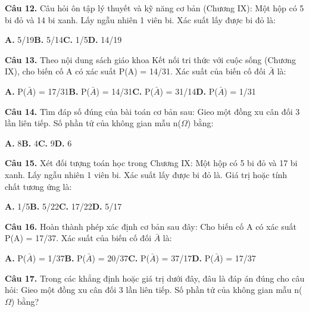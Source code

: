 \documentclass[11pt,a4paper]{article}
\begin{document}
\textbf{\color{primary} Câu 12.} Câu hỏi ôn tập lý thuyết và kỹ năng cơ bản (Chương IX): Một hộp có 5 bi đỏ và 14 bi xanh. Lấy ngẫu nhiên 1 viên bi. Xác suất lấy được bi đỏ là:\par
\hspace*{1.5em}\textbf{A.} 5/19\quad\quad \textbf{B.} 5/14\quad\quad \textbf{C.} 1/5\quad\quad \textbf{D.} 14/19\par\vspace{2pt}
\textbf{\color{primary} Câu 13.} Theo nội dung sách giáo khoa Kết nối tri thức với cuộc sống (Chương IX), cho biến cố A có xác suất P(A) = 14/31. Xác suất của biến cố đối $\bar{A}$ là:\par
\hspace*{1.5em}\textbf{A.} P($\bar{A}$) = 17/31\quad\quad \textbf{B.} P($\bar{A}$) = 14/31\quad\quad \textbf{C.} P($\bar{A}$) = 31/14\quad\quad \textbf{D.} P($\bar{A}$) = 1/31\par\vspace{2pt}
\textbf{\color{primary} Câu 14.} Tìm đáp số đúng của bài toán cơ bản sau: Gieo một đồng xu cân đối 3 lần liên tiếp. Số phần tử của không gian mẫu n($\Omega$) bằng:\par
\hspace*{1.5em}\textbf{A.} 8\quad\quad \textbf{B.} 4\quad\quad \textbf{C.} 9\quad\quad \textbf{D.} 6\par\vspace{2pt}
\textbf{\color{primary} Câu 15.} Xét đối tượng toán học trong Chương IX: Một hộp có 5 bi đỏ và 17 bi xanh. Lấy ngẫu nhiên 1 viên bi. Xác suất lấy được bi đỏ là. Giá trị hoặc tính chất tương ứng là:\par
\hspace*{1.5em}\textbf{A.} 1/5\quad\quad \textbf{B.} 5/22\quad\quad \textbf{C.} 17/22\quad\quad \textbf{D.} 5/17\par\vspace{2pt}
\textbf{\color{primary} Câu 16.} Hoàn thành phép xác định cơ bản sau đây: Cho biến cố A có xác suất P(A) = 17/37. Xác suất của biến cố đối $\bar{A}$ là:\par
\hspace*{1.5em}\textbf{A.} P($\bar{A}$) = 1/37\quad\quad \textbf{B.} P($\bar{A}$) = 20/37\quad\quad \textbf{C.} P($\bar{A}$) = 37/17\quad\quad \textbf{D.} P($\bar{A}$) = 17/37\par\vspace{2pt}
\textbf{\color{primary} Câu 17.} Trong các khẳng định hoặc giá trị dưới đây, đâu là đáp án đúng cho câu hỏi: Gieo một đồng xu cân đối 3 lần liên tiếp. Số phần tử của không gian mẫu n($\Omega$) bằng?\par
\end{document}
